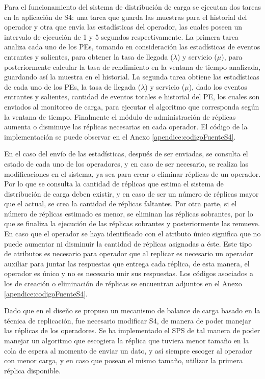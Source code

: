 Para el funcionamiento del sistema de distribución de carga se ejecutan dos tareas en la aplicación de S4: una tarea que guarda las muestras para el historial del operador y otra que envía las estadísticas del operador, las cuales poseen un intervalo de ejecución de 1 y 5 segundos respectivamente. La primera tarea analiza cada uno de los PEs, tomando en consideración las estadísticas de eventos entrantes y salientes, para obtener la tasa de llegada ($\lambda$) y servicio ($\mu$), para posteriormente calcular la tasa de rendimiento en la ventana de tiempo analizada, guardando así la muestra en el historial. La segunda tarea obtiene las estadísticas de cada uno de los PEs, la tasa de llegada ($\lambda$) y servicio ($\mu$), dado los eventos entrantes y salientes, cantidad de eventos totales e historial del PE, los cuales son enviados al monitoreo de carga, para ejecutar el algoritmo que corresponda según la ventana de tiempo. Finalmente el módulo de administración de réplicas aumenta o disminuye las réplicas necesarias en cada operador. El código de la implementación se puede observar en el Anexo \ref{apendice:codigoFuenteS4}.

En el caso del envío de las estadísticas, después de ser enviadas, se consulta el estado de cada uno de los operadores, y en caso de ser necesario, se realiza las modificaciones en el sistema, ya sea para crear o eliminar réplicas de un operador. Por lo que se consulta la cantidad de réplicas que estima el sistema de distribución de carga deben existir, y en caso de ser un número de réplicas mayor que el actual, se crea la cantidad de réplicas faltantes. Por otra parte, si el número de réplicas estimado es menor, se eliminan las réplicas sobrantes, por lo que se finaliza la ejecución de las réplicas sobrantes y posteriormente las remueve. En caso que el operador se haya identificado con el atributo único significa que no puede aumentar ni disminuir la cantidad de réplicas asignadas a éste. Este tipo de atributos es necesario para operador que al replicar es necesario un operador auxiliar para juntar las respuestas que entrega cada réplica, de esta manera, el operador es único y no es necesario unir sus respuestas. Los códigos asociados a los de creación o eliminación de réplicas se encuentran adjuntos en el Anexo \ref{apendice:codigoFuenteS4}.

Dado que en el diseño se propuso un mecanismo de balance de carga basado en la técnica de replicación, fue necesario modificar S4, de manera de poder manejar las réplicas de los operadores. Se ha implementado el SPS de tal manera de poder manejar un algoritmo que escogiera la réplica que tuviera menor tamaño en la cola de espera al momento de enviar un dato, y así siempre escoger al operador con menor carga, y en caso que posean el mismo tamaño, utilizar la primera réplica disponible.

